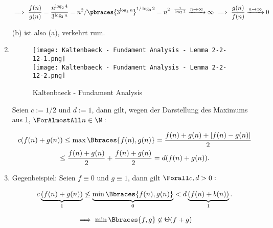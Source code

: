 \begin{solution}
\begin{enumerate}[label = (\alph*)]
  \begin{align*}
    \implies
    \frac{f(n)}{g(n)}
    =
    \frac{n^{\log_2{4}}}{3^{\log_2{n}}}
    =
    n^2 / \pbraces{3^{\log_3{n}}}^{1 / \log_3{2}}
    =
    n^{2 - \frac{1}{\log_3{2}}}
    \xrightarrow{n \to \infty} \infty
    \implies
    \frac{g(n)}{f(n)}
    \xrightarrow{n \to \infty} 0
  \end{align*}

  (b) ist also (a), verkehrt rum.

  \item

  \begin{figure}[h!]
    \begin{boxedin}
      \vspace{0.5 cm}
      \hspace{0.5 cm}
      \texttt{[image: Kaltenbaeck - Fundament Analysis - Lemma 2-2-12-1.png]} \\
      \vspace{0.01 cm}
      \hspace{0.5 cm}
      \texttt{[image: Kaltenbaeck - Fundament Analysis - Lemma 2-2-12-2.png]} \\
      \vspace{0.5 cm}
      \caption{Kaltenbaeck - Fundament Analysis}
      \label{fig:KFAL2.2.12}
    \end{boxedin}
  \end{figure}

  Seien $c := 1/2$ und $d := 1$, dann gilt, wegen der Darstellung des Maximums aus \ref{fig:KFAL2.2.12}, $\ForAlmostAll n \in \N:$

  \begin{multline*}
    c (f(n) + g(n))
    \leq
    \max \Bbraces{f(n), g(n)}
    =
    \frac{f(n) + g(n) + |f(n) - g(n)|}{2} \\
    \leq
    \frac{f(n) + g(n)}{2}
    +
    \frac{f(n) + g(n)}{2}
    =
    d (f(n) + g(n)).
  \end{multline*}

  \item Gegenbeispiel:
  Seien $f \equiv 0$ und $g \equiv 1$, dann gilt $\Forall c, d > 0:$

  \begin{align*}
    c \underbrace{(f(n) + g(n))}_1
    \not \leq
    \underbrace{\min \Bbraces{f(n), g(n)}}_0
    <
    d \underbrace{(f(n) + b(n))}_1.
  \end{align*}

  \begin{align*}
    \implies
    \min \Bbraces{f, g} \not \in \Theta(f + g)
  \end{align*}


\end{enumerate}
\end{solution}
